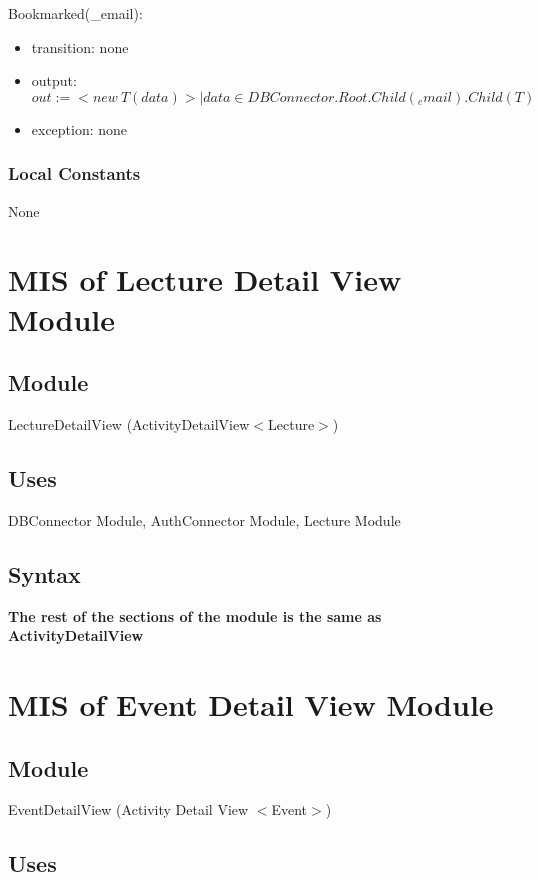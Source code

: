 \documentclass[12pt, titlepage]{article}
\begin{document}
\noindent Bookmarked(\_email):
\begin{itemize}
\item transition: none
\item output: $out := <new \ T(data)> | data \in DBConnector.Root.Child(_email).Child(T)$
\item exception: none
\end{itemize}

\subsubsection{Local Constants}

None

\newpage

\section{MIS of Lecture Detail View Module} \label{mLDV}

\subsection{Module}

LectureDetailView (ActivityDetailView$<$Lecture$>$)

\subsection{Uses}

DBConnector Module,  AuthConnector Module, Lecture Module

\subsection{Syntax}
\textbf{The rest of the sections of the module is the same as ActivityDetailView}

\newpage

\section{MIS of Event Detail View Module} \label{mEDV}

\subsection{Module}

EventDetailView (Activity Detail View $<$Event$>$)
\subsection{Uses}
\end{document}
